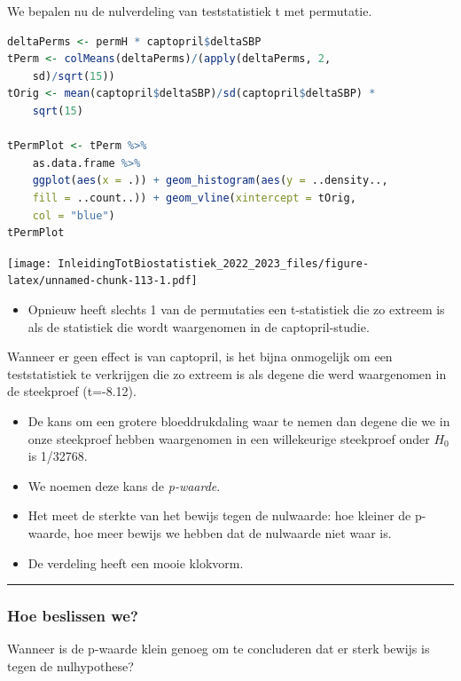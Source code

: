 \documentclass[
  12pt,dutch,coursenotes]{book}
\providecommand{\tightlist}{%
  \setlength{\itemsep}{0pt}\setlength{\parskip}{0pt}}
\begin{document}
We bepalen nu de nulverdeling van teststatistiek t met permutatie.

\begin{lstlisting}[language=R]
deltaPerms <- permH * captopril$deltaSBP
tPerm <- colMeans(deltaPerms)/(apply(deltaPerms, 2,
    sd)/sqrt(15))
tOrig <- mean(captopril$deltaSBP)/sd(captopril$deltaSBP) *
    sqrt(15)

tPermPlot <- tPerm %>%
    as.data.frame %>%
    ggplot(aes(x = .)) + geom_histogram(aes(y = ..density..,
    fill = ..count..)) + geom_vline(xintercept = tOrig,
    col = "blue")
tPermPlot
\end{lstlisting}

\texttt{[image: InleidingTotBiostatistiek\_2022\_2023\_files/figure-latex/unnamed-chunk-113-1.pdf]}

\begin{itemize}
\tightlist
\item
  Opnieuw heeft slechts 1 van de permutaties een t-statistiek die zo extreem is als de statistiek die wordt waargenomen in de captopril-studie.
\end{itemize}

Wanneer er geen effect is van captopril, is het bijna onmogelijk om een teststatistiek te verkrijgen die zo extreem is als degene die werd waargenomen in de steekproef (t=-8.12).

\begin{itemize}
\item
  De kans om een grotere bloeddrukdaling waar te nemen dan degene die we in onze steekproef hebben waargenomen in een willekeurige steekproef onder \(H_0\) is 1/32768.
\item
  We noemen deze kans de \emph{p-waarde}.
\item
  Het meet de sterkte van het bewijs tegen de nulwaarde: hoe kleiner de p-waarde, hoe meer bewijs we hebben dat de nulwaarde niet waar is.
\item
  De verdeling heeft een mooie klokvorm.
\end{itemize}

\begin{center}\rule{0.5\linewidth}{0.5pt}\end{center}

\hypertarget{hoe-beslissen-we}{%
\subsubsection{Hoe beslissen we?}\label{hoe-beslissen-we}}

Wanneer is de p-waarde klein genoeg om te concluderen dat er sterk bewijs is tegen de nulhypothese?
\end{document}
